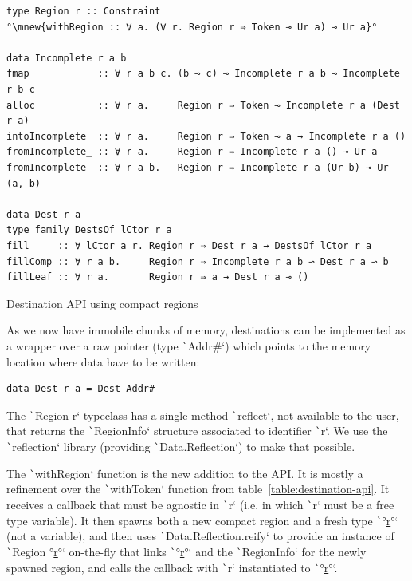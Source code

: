 \documentclass[english]{jflart}
\newcommand{\mnew}[1]{\colorbox{green}{#1}}
\newcommand{\muline}[1]{\uline{#1}}
\begin{document}
\begin{table}[t]
\small
\begin{verbatim}
type Region r :: Constraint
°\mnew{withRegion :: ∀ a. (∀ r. Region r ⇒ Token ⊸ Ur a) ⊸ Ur a}°

data Incomplete r a b
fmap            :: ∀ r a b c. (b ⊸ c) ⊸ Incomplete r a b ⊸ Incomplete r b c
alloc           :: ∀ r a.     Region r ⇒ Token ⊸ Incomplete r a (Dest r a)
intoIncomplete  :: ∀ r a.     Region r ⇒ Token ⊸ a → Incomplete r a ()
fromIncomplete_ :: ∀ r a.     Region r ⇒ Incomplete r a () ⊸ Ur a
fromIncomplete  :: ∀ r a b.   Region r ⇒ Incomplete r a (Ur b) ⊸ Ur (a, b)

data Dest r a
type family DestsOf lCtor r a
fill     :: ∀ lCtor a r. Region r ⇒ Dest r a → DestsOf lCtor r a
fillComp :: ∀ r a b.     Region r ⇒ Incomplete r a b ⊸ Dest r a ⊸ b
fillLeaf :: ∀ r a.       Region r ⇒ a → Dest r a ⊸ ()
\end{verbatim}
\caption{Destination API using compact regions}
\label{table:destination-api-regions}
\end{table}

As we now have immobile chunks of memory, destinations can be implemented as a wrapper over a raw pointer (type \texttt`Addr#`) which points to the memory location where data have to be written:

{\small
\begin{verbatim}
data Dest r a = Dest Addr#
\end{verbatim}
}

The \texttt`Region r` typeclass has a single method \texttt`reflect`, not available to the user, that returns the \texttt`RegionInfo` structure associated to identifier \texttt`r`. We use the \texttt`reflection` library (providing \texttt`Data.Reflection`) to make that possible.

The \texttt`withRegion` function is the new addition to the API. It is mostly a refinement over the \texttt`withToken` function from table~\ref{table:destination-api}. It receives a callback that must be agnostic in \texttt`r` (i.e. in which \texttt`r` must be a free type variable). It then spawns both a new compact region and a fresh type \texttt`°\muline{r}°` (not a variable), and then uses \texttt`Data.Reflection.reify` to provide an instance of \texttt`Region °\muline{r}°` on-the-fly that links \texttt`°\muline{r}°` and the \texttt`RegionInfo` for the newly spawned region, and calls the callback with \texttt`r` instantiated to \texttt`°\muline{r}°`.
\end{document}
